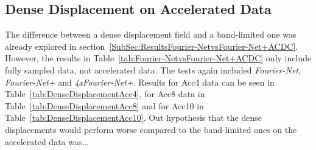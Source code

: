 \documentclass[english,version-2022-01]{uzl-thesis} %
\begin{document}
\subsection{Dense Displacement on Accelerated Data} \label{SubSec:DenseDisplacementAcc}
The difference between a dense displacement field and a band-limited one was already explored in section~\ref{SubSec:ResultsFourier-NetvsFourier-Net+ACDC}. However, the results in Table~\ref{tab:Fourier-NetvsFourier-Net+ACDC} only include fully sampled data, not accelerated data. The tests again included \emph{Fourier-Net}, \emph{Fourier-Net+} and \emph{4xFourier-Net+}. Results for Acc4 data can be seen in Table~\ref{tab:DenseDisplacementAcc4}, for Acc8 data in Table~\ref{tab:DenseDisplacementAcc8} and for Acc10 in Table~\ref{tab:DenseDisplacementAcc10}. Out hypothesis that the dense displacements would perform worse compared to the band-limited ones on the accelerated data was...
\end{document}
